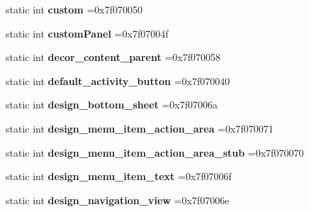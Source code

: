 \begin{DoxyCompactItemize}
static int {\bfseries custom} =0x7f070050
\item 
\mbox{\label{classandroid_1_1support_1_1v7_1_1mediarouter_1_1R_1_1id_ae166ce18406a1dc4d5f9ab84806a169a}} 
static int {\bfseries custom\+Panel} =0x7f07004f
\item 
\mbox{\label{classandroid_1_1support_1_1v7_1_1mediarouter_1_1R_1_1id_a43d1f2fb0d250f0df9692c7d970ed1f2}} 
static int {\bfseries decor\+\_\+content\+\_\+parent} =0x7f070058
\item 
\mbox{\label{classandroid_1_1support_1_1v7_1_1mediarouter_1_1R_1_1id_a07626501dbbdf01347019eca525b1799}} 
static int {\bfseries default\+\_\+activity\+\_\+button} =0x7f070040
\item 
\mbox{\label{classandroid_1_1support_1_1v7_1_1mediarouter_1_1R_1_1id_a7e020e710b4d8ad58bd4feb48a19939c}} 
static int {\bfseries design\+\_\+bottom\+\_\+sheet} =0x7f07006a
\item 
\mbox{\label{classandroid_1_1support_1_1v7_1_1mediarouter_1_1R_1_1id_a9c83ba7a0a174ede38603823923c41b9}} 
static int {\bfseries design\+\_\+menu\+\_\+item\+\_\+action\+\_\+area} =0x7f070071
\item 
\mbox{\label{classandroid_1_1support_1_1v7_1_1mediarouter_1_1R_1_1id_a7ec0bf654ad756f56c53917c695e329f}} 
static int {\bfseries design\+\_\+menu\+\_\+item\+\_\+action\+\_\+area\+\_\+stub} =0x7f070070
\item 
\mbox{\label{classandroid_1_1support_1_1v7_1_1mediarouter_1_1R_1_1id_a6a622adff3ac634468eacc209771c038}} 
static int {\bfseries design\+\_\+menu\+\_\+item\+\_\+text} =0x7f07006f
\item 
\mbox{\label{classandroid_1_1support_1_1v7_1_1mediarouter_1_1R_1_1id_a5d03635c522bdb476d694cddc90893c8}} 
static int {\bfseries design\+\_\+navigation\+\_\+view} =0x7f07006e

\end{DoxyCompactItemize}
